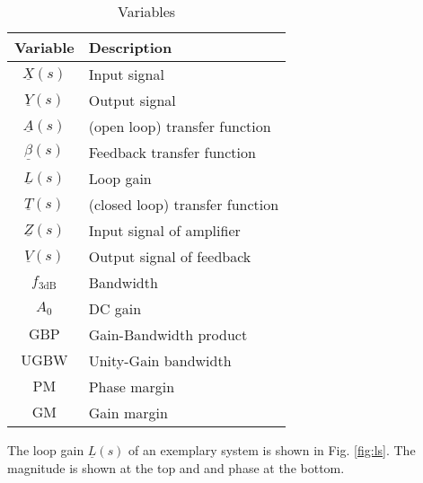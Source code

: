 \documentclass{article}[11pt]
\begin{document}
\begin{table}[H]
\centering
\caption{Variables}
\begin{tabular}{cl}
\toprule
\textbf{Variable}       & \textbf{Description}            \\ \midrule
$\underline{X}(s)$      & Input signal                    \\ 
$\underline{Y}(s)$      & Output signal                   \\
$\underline{A}(s)$      & (open loop) transfer function   \\
$\underline{\beta}(s)$  & Feedback transfer function      \\
$\underline{L}(s)$      & Loop gain                       \\
$\underline{T}(s)$      & (closed loop) transfer function \\
$\underline{Z}(s)$      & Input signal of amplifier       \\
$\underline{V}(s)$      & Output signal of feedback       \\
$f_{\mathrm{3dB}}$      & Bandwidth                       \\
$A_{\mathrm{0}}$        & DC gain                         \\
$\mathrm{GBP}$          & Gain-Bandwidth product          \\
$\mathrm{UGBW}$         & Unity-Gain bandwidth            \\
$\mathrm{PM}$           & Phase margin                    \\
$\mathrm{GM}$           & Gain margin                     \\ \toprule
\end{tabular}
\label{tab:variables}
\end{table}

The loop gain $\underline{L}(s)$ of an exemplary system is shown in 
Fig. \ref{fig:ls}.
The magnitude is shown at the top and and phase at the bottom.
\end{document}
